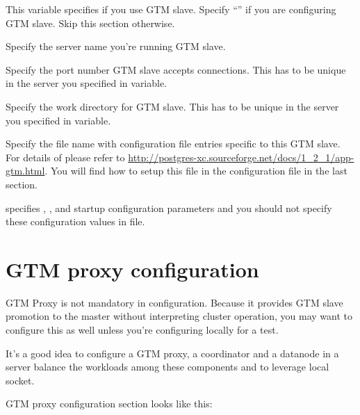   
		This variable specifies if you use GTM slave.
		Specify ``'' if you are configuring GTM slave.
		Skip this section otherwise.
  
  
		Specify the server name you're running GTM slave.
  
  
		Specify the port number GTM slave accepts connections.
		This has to be unique in the server you specified in  variable.
  
  
		Specify the work directory for GTM slave.
		This has to be unique in the server you specified in  variable.
  
  
		Specify the file name with  configuration file entries specific to this GTM slave.
		For details of  please refer to
		\url{http://postgres-xc.sourceforge.net/docs/1_2_1/app-gtm.html}.
		You will find how to setup this file in the configuration file in the last section.

		 specifies , , and  startup
		configuration parameters and you should not specify these configuration values in
		 file.
 


\section{GTM proxy configuration}
  
  GTM Proxy is not mandatory in \XC{} configuration.
  Because it provides GTM slave promotion to the master without interpreting \XC{} cluster
  operation, you may want to configure this as well unless you're configuring \XC{} locally
  for a test.
  
  It's a good idea to configure a GTM proxy, a coordinator and a datanode in a server
  balance the workloads among these components and to leverage local socket.
  
  GTM proxy configuration section looks like this:
  
